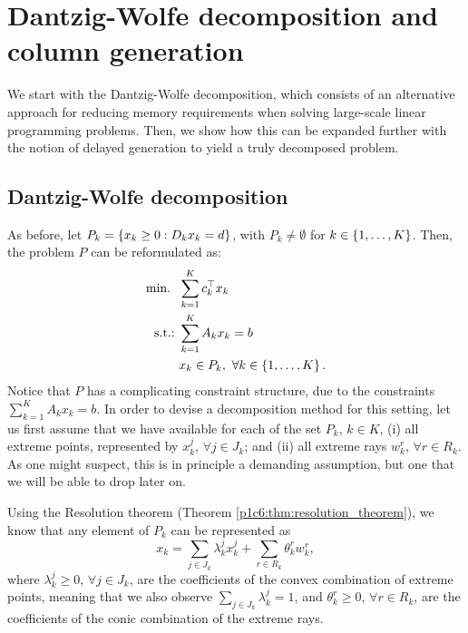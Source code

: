 \section{Dantzig-Wolfe decomposition and column generation} \label{section_72}

We start with the Dantzig-Wolfe decomposition, which consists of an alternative approach for reducing memory requirements when solving large-scale linear programming problems. Then, we show how this can be expanded further with the notion of delayed generation to yield a truly decomposed problem.


\subsection{Dantzig-Wolfe decomposition}

As before, let $P_k = \left\{ x_k \geq 0 : D_kx_k = d \right \}$, with $P_k \neq \emptyset$ for $k \in \left\{ 1,\dots,K \right \}$. Then, the problem $P$ can be reformulated as:
%
\begin{align*}
	\mathop{\text{min.~}} \ & \sum_{k = 1}^K c_k ^\top x_k 	\\
	\mathop{\text{s.t.:~}} & \sum_{k=1}^K A_k x_k = b \\
	& x_k \in P_k, \ \forall k \in \left\{ 1,\dots,K \right \}. 
\end{align*}
%
Notice that $P$ has a complicating constraint structure, due to the constraints $\sum_{k=1}^K A_k x_k = b$. In order to devise a decomposition method for this setting, let us first assume that we have available for each of the set $P_k$, $k \in K$, (i) all extreme points, represented by $x_k^j$, $\forall j \in J_k$; and (ii) all extreme rays $w_k^r$, $\forall r \in R_k$. As one might suspect, this is in principle a demanding assumption, but one that we will be able to drop later on.

Using the Resolution theorem (Theorem \ref{p1c6:thm:resolution_theorem}), we know that any element of $P_k$ can be represented as 
%
\begin{equation} \label{p1c7:eq:resolution_representation}
	x_k = \sum_{j \in J_k} \lambda_k^j x_k^j + \sum_{r \in R_k} \theta_k^r w_k^r, 	
\end{equation}
%
where $\lambda_k^j \geq 0$, $\forall j \in J_k$, are the coefficients of the convex combination of extreme points, meaning that we also observe $\sum_{j \in J_k} \lambda_k^j = 1$, and $\theta_k^r \geq 0$, $\forall r \in R_k$, are the coefficients of the conic combination of the extreme rays.


